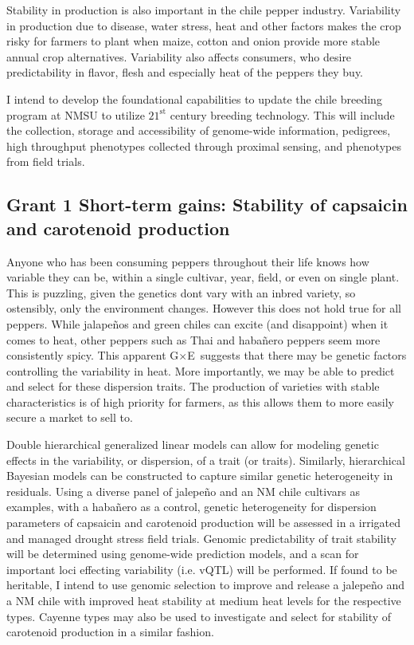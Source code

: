 \documentclass[11pt]{article}
\newcommand{\gxe}{G$\times$E}
\begin{document}
Stability in production is also important in the chile pepper industry. Variability in production due to disease, water stress, heat and other factors makes the crop risky for farmers to plant when maize, cotton and onion provide more stable annual crop alternatives. Variability also affects consumers, who desire predictability in flavor, flesh and especially heat of the peppers they buy. 

I intend to develop the foundational capabilities to update the chile breeding program at NMSU to utilize $21^\text{st}$ century breeding technology. This will include the collection, storage and accessibility of genome-wide information, pedigrees, high throughput phenotypes collected through proximal sensing, and phenotypes from field trials. 


\subsection*{Grant 1 Short-term gains: Stability of capsaicin and carotenoid production}

Anyone who has been consuming peppers throughout their life knows how variable they can be, within a single cultivar, year, field, or even on single plant. This is puzzling, given the genetics dont vary with an inbred variety, so ostensibly, only the environment changes. However this does not hold true for all peppers. While jalape\~{n}os and green chiles can excite (and disappoint) when it comes to heat, other peppers such as Thai and haba\~{n}ero peppers seem more consistently spicy. This apparent \gxe\, suggests that there may be genetic factors controlling the variability in heat. More importantly, we may be able to predict and select for these dispersion traits. The production of varieties with stable characteristics is of high priority for farmers, as this allows them to more easily secure a market to sell to.

Double hierarchical generalized linear models can allow for modeling genetic effects in the variability, or dispersion, of a trait (or traits). Similarly, hierarchical Bayesian models can be constructed to capture similar genetic heterogeneity in residuals. Using a diverse panel of jalepe\~{n}o and an NM chile cultivars as examples, with a haba\~{n}ero as a control, genetic heterogeneity for dispersion parameters of capsaicin and carotenoid production will be assessed in a irrigated and managed drought stress field trials. Genomic predictability of trait stability will be determined using genome-wide prediction models, and a scan for important loci effecting variability (i.e. vQTL) will be performed. If found to be heritable, I intend to use genomic selection to improve and release a jalepe\~{n}o and a NM chile with improved heat stability at medium heat levels for the respective types. Cayenne types may also be used to investigate and select for stability of carotenoid production in a similar fashion. 
\end{document}
